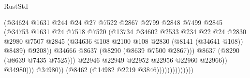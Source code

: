 \begin{lexlean}{RustStd}
\begin{coremodule}
                                            (@34624
                                              @1631
                                              @244
                                              @24
                                              @27
                                              @7522
                                              @2867
                                              @2799
                                              @2848
                                              @7499
                                              @2845
                                              (@34753
                                                @1631
                                                @24
                                                @7518
                                                @7520
                                                (@13734
                                                  @34602
                                                  @2533
                                                  @234
                                                  @22
                                                  @24
                                                  @2830
                                                  @2980
                                                  @7507
                                                  @2845
                                                  (@34636
                                                    @108
                                                    @2100
                                                    @108
                                                    @2830
                                                    (@8141 (@34641 @108))
                                                    @8489)
                                                  @9208))
                                              @34666
                                              @8637
                                              (@8290 (@8639 @7500 @2867)))
                                            @8637
                                            (@8290 (@8639 @7435 @7525)))
                                          @22946
                                          @22949
                                          @22952
                                          @22956
                                          @22960
                                          @22966))
                                      @34980)))
                                @34980))
                            (@8462 (@14982 @2219 @3846))))))))))))))

\end{coremodule}
\end{lexlean}
